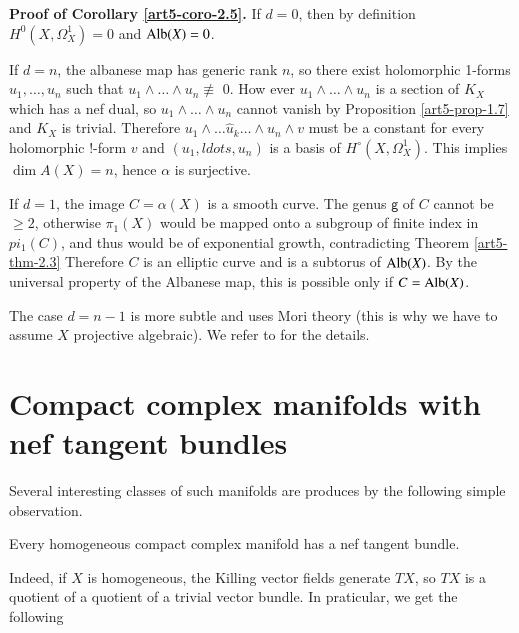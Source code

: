 \noindent
\textbf{Proof of Corollary \ref{art5-coro-2.5}.}
If $d=0$, then by definition $H^{0}(X, \Omega_{X}^{1}) = 0$ and $\operatorname{Alb}(X) = {0}$.

If $d=n$, the albanese map has generic rank $n$, so there exist holomorphic 1-forms $u_{1}, \ldots, u_{n}$ such that $u_{1}\wedge \ldots \wedge u_{n} \nequiv$ 0. How ever $u_{1}\wedge \ldots \wedge u_{n}$ is a section of $K_{X}$ which has a nef dual, so $u_{1} \wedge \ldots \wedge u_{n}$ cannot vanish by Proposition \ref{art5-prop-1.7} and $K_{X}$ is trivial. Therefore $u_{1} \wedge \ldots \hat{u}_{k}\ldots \wedge u_{n} \wedge v$ must be a constant for every holomorphic !-form $v$ and $(u_{1}, ldots, u_{n})$ is a basis of $H^{\circ}(X, \Omega_{X}^{1})$. This implies $\dim A(X)= n$, hence $\alpha$ is surjective.

If $d =1$, the image $C=\alpha(X)$ is a smooth curve. The genus $\mathsf{g}$ of $C$ cannot be $\geq 2$, otherwise $\pi_{1}(X)$ would be mapped onto a subgroup of finite index in $pi_{1}(C)$, and thus would be of exponential growth, contradicting Theorem \ref{art5-thm-2.3} Therefore $C$ is an elliptic curve and is a subtorus of $\operatorname{Alb}(X)$. By the universal property of the Albanese map, this is possible only if $C= \operatorname{Alb}(X)$.

The case $d =n-1$ is more subtle and uses Mori theory (this is why we have to assume $X$ projective algebraic). We refer to \cite{art5-keyDPS92} for the details.

\section{Compact complex manifolds with nef tangent bundles}

Several interesting classes of such manifolds are produces by the following simple observation.

\begin{prop}\label{art5-prop-3.1}
Every homogeneous compact complex manifold has a nef tangent bundle.
\end{prop}

Indeed, if $X$ is homogeneous, the Killing vector fields generate $TX$, so $TX$ is a quotient of a quotient of a trivial vector bundle. In praticular, we get the following

